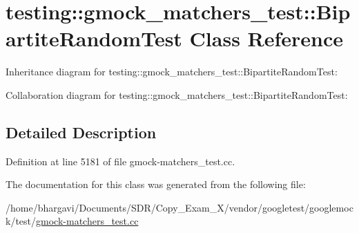 \hypertarget{classtesting_1_1gmock__matchers__test_1_1_bipartite_random_test}{}\section{testing\+:\+:gmock\+\_\+matchers\+\_\+test\+:\+:Bipartite\+Random\+Test Class Reference}
\label{classtesting_1_1gmock__matchers__test_1_1_bipartite_random_test}


Inheritance diagram for testing\+:\+:gmock\+\_\+matchers\+\_\+test\+:\+:Bipartite\+Random\+Test\+:


Collaboration diagram for testing\+:\+:gmock\+\_\+matchers\+\_\+test\+:\+:Bipartite\+Random\+Test\+:


\subsection{Detailed Description}


Definition at line 5181 of file gmock-\/matchers\+\_\+test.\+cc.



The documentation for this class was generated from the following file\+:\begin{DoxyCompactItemize}
\item 
/home/bhargavi/\+Documents/\+S\+D\+R/\+Copy\+\_\+\+Exam\+\_\+X/vendor/googletest/googlemock/test/\hyperlink{gmock-matchers__test_8cc}{gmock-\/matchers\+\_\+test.\+cc}\end{DoxyCompactItemize}
